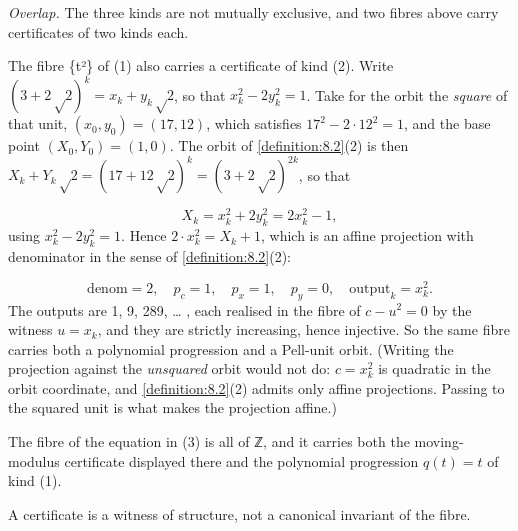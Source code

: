 \emph{Overlap.} The three kinds are not mutually exclusive, and two fibres above carry certificates of two kinds each.

The fibre \{t²\} of (1) also carries a certificate of kind (2). Write $(3 + 2√2)^{k} = x_{k} + y_{k}√2$, so that $x_{k}^{2} − 2y_{k}^{2} = 1$. Take for the orbit the \emph{square} of that unit, $(x_{0}, y_{0}) = (17, 12)$, which satisfies $17^{2} − 2·12^{2} = 1$, and the base point $(X_{0}, Y_{0}) = (1, 0)$. The orbit of \cref{definition:8.2}(2) is then $X_{k} + Y_{k}√2 = (17 + 12√2)^{k} = (3 + 2√2)^{2k}$, so that

\[
X_{k} = x_{k}^{2} + 2y_{k}^{2} = 2x_{k}^{2} − 1,
\]
using $x_{k}^{2} − 2y_{k}^{2} = 1$. Hence $2·x_{k}^{2} = X_{k} + 1$, which is an affine projection with denominator in the sense of \cref{definition:8.2}(2):

\[
\text{denom} = 2, \quad p_{c} = 1, \quad p_{x} = 1, \quad p_{y} = 0, \quad \text{output}_{k} = x_{k}^{2}.
\]
The outputs are 1, 9, 289, … , each realised in the fibre of $c − u^{2} = 0$ by the witness $u = x_{k}$, and they are strictly increasing, hence injective. So the same fibre carries both a polynomial progression and a Pell-unit orbit. (Writing the projection against the \emph{unsquared} orbit would not do: $c = x_{k}^{2}$ is quadratic in the orbit coordinate, and \cref{definition:8.2}(2) admits only affine projections. Passing to the squared unit is what makes the projection affine.)

The fibre of the equation in (3) is all of ℤ, and it carries both the moving-modulus certificate displayed there and the polynomial progression $q(t) = t$ of kind (1).

A certificate is a witness of structure, not a canonical invariant of the fibre.

